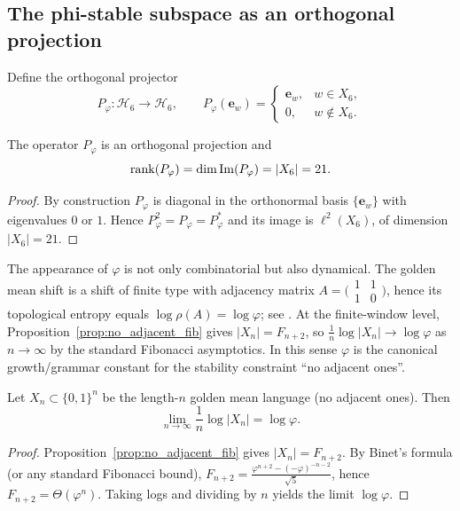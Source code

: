 \subsection{The phi-stable subspace as an orthogonal projection}
Define the orthogonal projector
\[
P_\varphi:\mathcal{H}_6\to\mathcal{H}_6,
\qquad
P_\varphi(\mathbf{e}_w)=
\begin{cases}
\mathbf{e}_w, & w\in X_6,\\
0, & w\notin X_6.
\end{cases}
\]

\begin{proposition}
\label{prop:pvarphi_rank}
The operator $P_\varphi$ is an orthogonal projection and
\[
\operatorname{rank}(P_\varphi)=\dim \mathrm{Im}(P_\varphi)=|X_6|=21.
\]
\end{proposition}

\begin{proof}
By construction $P_\varphi$ is diagonal in the orthonormal basis $\{\mathbf{e}_w\}$ with eigenvalues $0$ or $1$.
Hence $P_\varphi^2=P_\varphi=P_\varphi^\ast$ and its image is $\ell^2(X_6)$, of dimension $|X_6|=21$.
\end{proof}

\begin{remark}
The appearance of $\varphi$ is not only combinatorial but also dynamical.
The golden mean shift is a shift of finite type with adjacency matrix $A=\bigl(\begin{smallmatrix}1&1\\1&0\end{smallmatrix}\bigr)$, hence its topological entropy equals $\log\rho(A)=\log\varphi$; see \cite{LindMarcus1995}.
At the finite-window level, Proposition~\ref{prop:no_adjacent_fib} gives $|X_n|=F_{n+2}$, so $\frac{1}{n}\log|X_n|\to \log\varphi$ as $n\to\infty$ by the standard Fibonacci asymptotics.
In this sense $\varphi$ is the canonical growth/grammar constant for the stability constraint ``no adjacent ones''.
\end{remark}

\begin{proposition}
\label{prop:entropy_from_growth}
Let $X_n\subset\{0,1\}^n$ be the length-$n$ golden mean language (no adjacent ones).
Then
\[
\lim_{n\to\infty}\frac{1}{n}\log|X_n|=\log\varphi.
\]
\end{proposition}

\begin{proof}
Proposition~\ref{prop:no_adjacent_fib} gives $|X_n|=F_{n+2}$.
By Binet's formula (or any standard Fibonacci bound), $F_{n+2}=\frac{\varphi^{n+2}-(-\varphi)^{-n-2}}{\sqrt{5}}$, hence $F_{n+2}=\Theta(\varphi^n)$.
Taking logs and dividing by $n$ yields the limit $\log\varphi$.
\end{proof}


